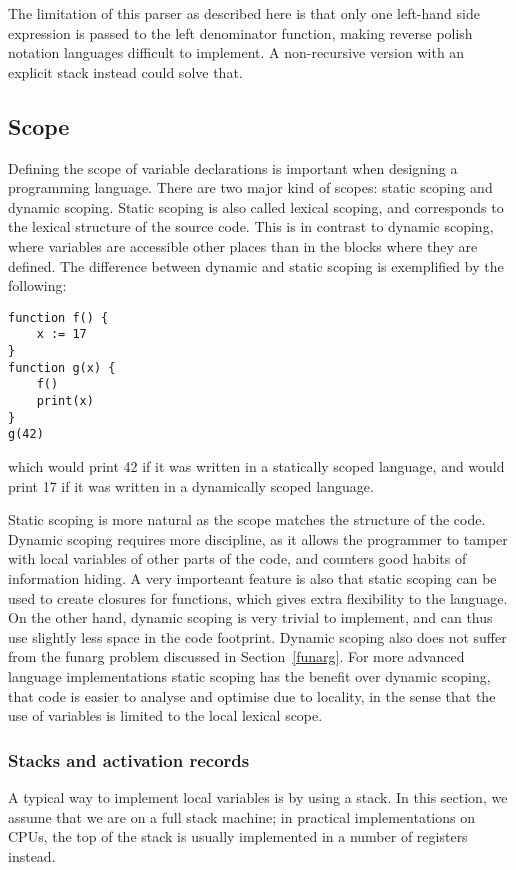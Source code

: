 \documentclass[11pt]{report}
\begin{document}
The limitation of this parser as described here is that only one left-hand side expression is passed to the left denominator function, making reverse polish notation languages difficult to implement. A non-recursive version with an explicit stack instead could solve that.

\subsection{Scope}
\label{survey-scope}
Defining the scope of variable declarations  is important when designing a programming language.
There are two major kind of scopes: static scoping and dynamic scoping.
Static scoping is also called lexical scoping, and corresponds to the lexical structure of the source code.
This is in contrast to dynamic scoping, where variables are accessible other places than in the blocks where they are defined. 
The difference between dynamic and static scoping is exemplified by the following:
\begin{verbatim}
function f() {
    x := 17
}
function g(x) {
    f()
    print(x)
}
g(42)
\end{verbatim}
which would print 42 if it was written in a statically scoped language, and would print 17 if it was written in a dynamically scoped language.

Static scoping is more natural as the scope matches the structure of the code. Dynamic scoping requires more discipline, as it allows the programmer to tamper with local variables of other parts of the code, and counters good habits of information hiding. A very importeant feature is also that static scoping can be used to create closures for functions, which gives extra flexibility to the language.
On the other hand, dynamic scoping is very trivial to implement, and can thus use slightly less space in the code footprint. 
Dynamic scoping also does not suffer from the funarg problem discussed in Section~\ref{funarg}.
For more advanced language implementations static scoping has the benefit over dynamic scoping, that code is easier to analyse and optimise due to locality, in the sense that the use of variables is limited to the local lexical scope.

\subsubsection{Stacks and activation records}
A typical way to implement local variables is by using a stack.
In this section, we assume that we are on a full stack machine; 
in practical implementations on CPUs, the top of the stack is usually implemented in a number of registers instead.
\end{document}
